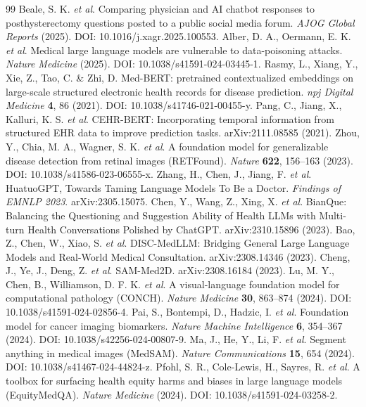 \begin{thebibliography}{99}
 Beale, S. K. \textit{et al}. Comparing physician and AI chatbot responses to posthysterectomy questions posted to a public social media forum. \textit{AJOG Global Reports} (2025). DOI: 10.1016/j.xagr.2025.100553.
 Alber, D. A., Oermann, E. K. \textit{et al}. Medical large language models are vulnerable to data-poisoning attacks. \textit{Nature Medicine} (2025). DOI: 10.1038/s41591-024-03445-1.
 Rasmy, L., Xiang, Y., Xie, Z., Tao, C. \& Zhi, D. Med-BERT: pretrained contextualized embeddings on large-scale structured electronic health records for disease prediction. \textit{npj Digital Medicine} \textbf{4}, 86 (2021). DOI: 10.1038/s41746-021-00455-y.
 Pang, C., Jiang, X., Kalluri, K. S. \textit{et al}. CEHR-BERT: Incorporating temporal information from structured EHR data to improve prediction tasks. arXiv:2111.08585 (2021).
 Zhou, Y., Chia, M. A., Wagner, S. K. \textit{et al}. A foundation model for generalizable disease detection from retinal images (RETFound). \textit{Nature} \textbf{622}, 156--163 (2023). DOI: 10.1038/s41586-023-06555-x.
 Zhang, H., Chen, J., Jiang, F. \textit{et al}. HuatuoGPT, Towards Taming Language Models To Be a Doctor. \textit{Findings of EMNLP 2023}. arXiv:2305.15075.
 Chen, Y., Wang, Z., Xing, X. \textit{et al}. BianQue: Balancing the Questioning and Suggestion Ability of Health LLMs with Multi-turn Health Conversations Polished by ChatGPT. arXiv:2310.15896 (2023).
 Bao, Z., Chen, W., Xiao, S. \textit{et al}. DISC-MedLLM: Bridging General Large Language Models and Real-World Medical Consultation. arXiv:2308.14346 (2023).
 Cheng, J., Ye, J., Deng, Z. \textit{et al}. SAM-Med2D. arXiv:2308.16184 (2023).
 Lu, M. Y., Chen, B., Williamson, D. F. K. \textit{et al}. A visual-language foundation model for computational pathology (CONCH). \textit{Nature Medicine} \textbf{30}, 863--874 (2024). DOI: 10.1038/s41591-024-02856-4.
 Pai, S., Bontempi, D., Hadzic, I. \textit{et al}. Foundation model for cancer imaging biomarkers. \textit{Nature Machine Intelligence} \textbf{6}, 354--367 (2024). DOI: 10.1038/s42256-024-00807-9.
 Ma, J., He, Y., Li, F. \textit{et al}. Segment anything in medical images (MedSAM). \textit{Nature Communications} \textbf{15}, 654 (2024). DOI: 10.1038/s41467-024-44824-z.
 Pfohl, S. R., Cole-Lewis, H., Sayres, R. \textit{et al}. A toolbox for surfacing health equity harms and biases in large language models (EquityMedQA). \textit{Nature Medicine} (2024). DOI: 10.1038/s41591-024-03258-2.

\end{thebibliography}

